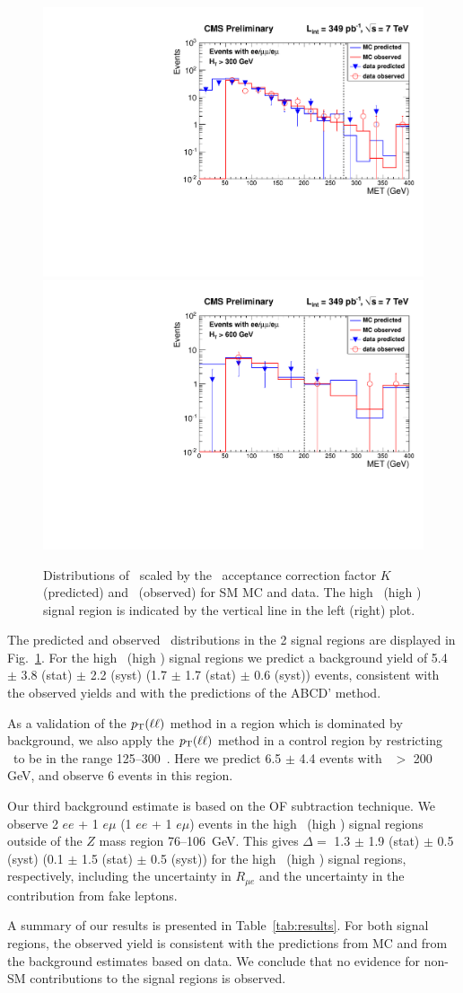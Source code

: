 \begin{figure}[hbt]
\begin{center}
\includegraphics[width=0.48\linewidth]{plots_final/victory_met275_ht300_349pb.pdf}
\includegraphics[width=0.48\linewidth]{plots_final/victory_met200_ht600_349pb.pdf}
\caption{\label{fig:victory}\protect 
Distributions of \ptll\ scaled by the \MET\ acceptance correction factor $K$ (predicted) 
and \met\ (observed) for SM MC and data. The high \MET\ (high \Ht) signal region
is indicated by the vertical line in the left (right) plot.
}
\end{center}
\end{figure}

The predicted and observed \MET\ distributions in the 2 signal regions are displayed
in Fig.~\ref{fig:victory}. For the high \MET\ (high \Ht) signal regions we predict
a background yield of 5.4 $\pm$ 3.8 (stat) $\pm$ 2.2 (syst) 
(1.7 $\pm$ 1.7 (stat) $\pm$ 0.6 (syst)) events, consistent with the observed yields
and with the predictions of the ABCD' method. 

As a validation of the $p_{\mathrm{T}}(\ell\ell)$ method in a region which is dominated by
background, we also apply the $p_{\mathrm{T}}(\ell\ell)$ method in a control region by restricting
\HT\ to be in the range 125--300~\GeV. Here we predict 6.5 $\pm$ 4.4 events with
\MET\ $>$ 200 GeV, and observe 6 events in this region.

Our third background estimate is based on the OF subtraction technique. We observe
2 $ee$ + 1 $e\mu$ (1 $ee$ + 1 $e\mu$) events in the high \MET\ (high \Ht) signal
regions outside of the $Z$ mass region 76--106~GeV. This gives 
$\Delta = $ 1.3 $\pm$ 1.9 (stat) $\pm$ 0.5 (syst) 
(0.1 $\pm$ 1.5 (stat) $\pm$ 0.5 (syst)) for the high \MET\ (high \Ht) signal regions,
respectively, including the uncertainty in $R_{\mu e}$ and the uncertainty in the
contribution from fake leptons.

A summary of our results is presented in Table~\ref{tab:results}. For both signal regions,
the observed yield is consistent with the predictions from MC and from the background estimates
based on data. We conclude that no evidence for non-SM contributions to the signal regions
is observed.
